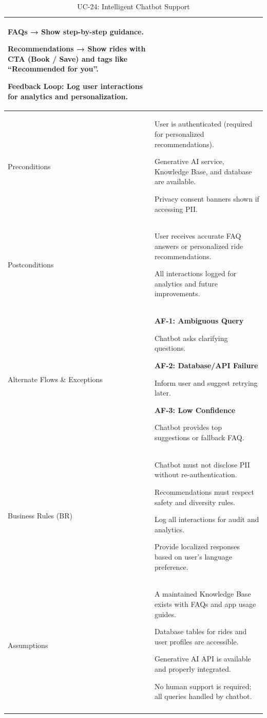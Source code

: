 \begin{longtable}{|p{3.5cm}|p{12cm}|}
FAQs → Show step-by-step guidance.

Recommendations → Show rides with CTA (Book / Save) and tags like “Recommended for you”.

Feedback Loop: Log user interactions for analytics and personalization. \\
\hline
Preconditions &
User is authenticated (required for personalized recommendations).

Generative AI service, Knowledge Base, and database are available.

Privacy consent banners shown if accessing PII. \\
\hline
Postconditions &
User receives accurate FAQ answers or personalized ride recommendations.

All interactions logged for analytics and future improvements. \\
\hline
Alternate Flows \& Exceptions &
\textbf{AF-1: Ambiguous Query}

Chatbot asks clarifying questions.

\textbf{AF-2: Database/API Failure}

Inform user and suggest retrying later.

\textbf{AF-3: Low Confidence}

Chatbot provides top suggestions or fallback FAQ. \\
\hline
Business Rules (BR) &
Chatbot must not disclose PII without re-authentication.

Recommendations must respect safety and diversity rules.

Log all interactions for audit and analytics.

Provide localized responses based on user’s language preference. \\
\hline
Assumptions &
A maintained Knowledge Base exists with FAQs and app usage guides.

Database tables for rides and user profiles are accessible.

Generative AI API is available and properly integrated.

No human support is required; all queries handled by chatbot. \\
\hline
\caption{UC-24: Intelligent Chatbot Support}
\end{longtable}

